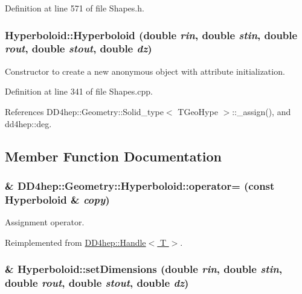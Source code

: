 Definition at line 571 of file Shapes.h.\hypertarget{class_d_d4hep_1_1_geometry_1_1_hyperboloid_a1ba636fc512e1c1c1c183a8ab24db52f}{
\subsubsection[{Hyperboloid}]{\setlength{\rightskip}{0pt plus 5cm}Hyperboloid::Hyperboloid (double {\em rin}, \/  double {\em stin}, \/  double {\em rout}, \/  double {\em stout}, \/  double {\em dz})}}
\label{class_d_d4hep_1_1_geometry_1_1_hyperboloid_a1ba636fc512e1c1c1c183a8ab24db52f}


Constructor to create a new anonymous object with attribute initialization. 

Definition at line 341 of file Shapes.cpp.

References DD4hep::Geometry::Solid\_\-type$<$ TGeoHype $>$::\_\-assign(), and dd4hep::deg.

\subsection{Member Function Documentation}
\hypertarget{class_d_d4hep_1_1_geometry_1_1_hyperboloid_a8c67ce2f3b902836c6b4c3b7b0e889c4}{
\subsubsection[{operator=}]{\& DD4hep::Geometry::Hyperboloid::operator= (const {\bf Hyperboloid} \& {\em copy})}}
\label{class_d_d4hep_1_1_geometry_1_1_hyperboloid_a8c67ce2f3b902836c6b4c3b7b0e889c4}


Assignment operator. 

Reimplemented from \hyperlink{class_d_d4hep_1_1_handle_a9bbf8f498df42e81ad26fb00233505a6}{DD4hep::Handle$<$ T $>$}.\hypertarget{class_d_d4hep_1_1_geometry_1_1_hyperboloid_a17bc3db816fee3f9486603fb799063e2}{
\subsubsection[{setDimensions}]{ \& Hyperboloid::setDimensions (double {\em rin}, \/  double {\em stin}, \/  double {\em rout}, \/  double {\em stout}, \/  double {\em dz})}}
\label{class_d_d4hep_1_1_geometry_1_1_hyperboloid_a17bc3db816fee3f9486603fb799063e2}


